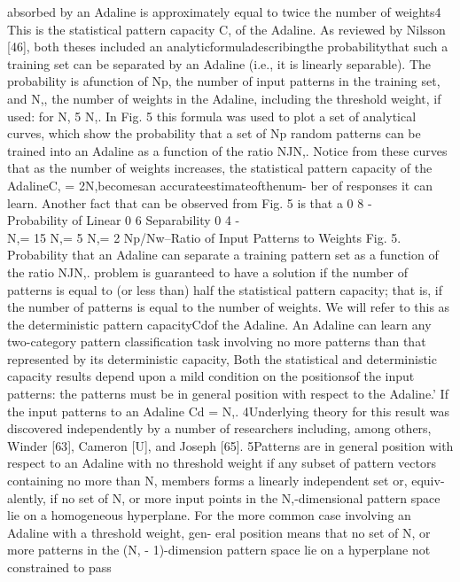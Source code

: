 absorbed by an Adaline is approximately equal to twice the number of
weights4 This is the statistical pattern capacity C, of the Adaline. As
reviewed by Nilsson {[}46{]}, both theses included an
analyticformuladescribingthe probabilitythat such a training set can be
separated by an Adaline (i.e., it is linearly separable). The
probability is afunction of Np, the number of input patterns in the
training set, and N,, the number of weights in the Adaline, including
the threshold weight, if used: for N, 5 N,. In Fig. 5 this formula was
used to plot a set of analytical curves, which show the probability that
a set of Np random patterns can be trained into an Adaline as a function
of the ratio NJN,. Notice from these curves that as the number of
weights increases, the statistical pattern capacity of the AdalineC, =
2N,becomesan accurateestimateofthenum- ber of responses it can learn.
Another fact that can be observed from Fig. 5 is that a 0 8 -\\
Probability of Linear 0 6 Separability 0 4 -\\
N,= 15 N,= 5 N,= 2 Np/Nw--Ratio of Input Patterns to Weights Fig. 5.
Probability that an Adaline can separate a training pattern set as a
function of the ratio NJN,. problem is guaranteed to have a solution if
the number of patterns is equal to (or less than) half the statistical
pattern capacity; that is, if the number of patterns is equal to the
number of weights. We will refer to this as the deterministic pattern
capacityCdof the Adaline. An Adaline can learn any two-category pattern
classification task involving no more patterns than that represented by
its deterministic capacity, Both the statistical and deterministic
capacity results depend upon a mild condition on the positionsof the
input patterns: the patterns must be in general position with respect to
the Adaline.' If the input patterns to an Adaline Cd = N,. 4Underlying
theory for this result was discovered independently by a number of
researchers including, among others, Winder {[}63{]}, Cameron {[}U{]},
and Joseph {[}65{]}. 5Patterns are in general position with respect to
an Adaline with no threshold weight if any subset of pattern vectors
containing no more than N, members forms a linearly independent set or,
equiv- alently, if no set of N, or more input points in the
N,-dimensional pattern space lie on a homogeneous hyperplane. For the
more common case involving an Adaline with a threshold weight, gen- eral
position means that no set of N, or more patterns in the (N, -
1)-dimension pattern space lie on a hyperplane not constrained to pass
